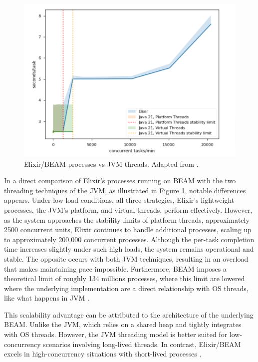 \begin{figure}
    \centering
    \includegraphics[width=120mm]{ch-state/assets/elixir-vs-jvm-threads.png}
    \caption[Elixir/BEAM processes vs JVM threads]{Elixir/BEAM processes vs JVM threads. Adapted from \cite{erlang-concurrency-blog}.}
    \label{fig:beam-vs-jvm}
\end{figure}

In a direct comparison of Elixir’s processes running on \gls{BEAM} with the two threading techniques of the \gls{JVM}, as illustrated in Figure \ref{fig:beam-vs-jvm}, notable differences appears. Under low load conditions, all three strategies, Elixir’s lightweight processes, the \gls{JVM}’s platform, and virtual threads, perform effectively. However, as the system approaches the stability limits of platform threads, approximately 2500 concurrent units, Elixir continues to handle additional processes, scaling up to approximately 200,000 concurrent processes. Although the per-task completion time increases slightly under such high loads, the system remains operational and stable. The opposite occurs with both \gls{JVM} techniques, resulting in an overload that makes maintaining pace impossible. Furthermore, \gls{BEAM} imposes a theoretical limit of roughly 134 millions processes, where this limit are lowered where the underlying implementation are a direct relationship with \gls{OS} threads, like what happens in \gls{JVM} \cite{Juric2024}.

This scalability advantage can be attributed to the architecture of the underlying \gls{BEAM}. Unlike the \gls{JVM}, which relies on a shared heap and tightly integrates with \gls{OS} threads. However, the \gls{JVM} threading model is better suited for low-concurrency scenarios involving long-lived threads. In contrast, Elixir/\gls{BEAM} excels in high-concurrency situations with short-lived processes \cite{erlang-concurrency-blog, Valkov2018}.

